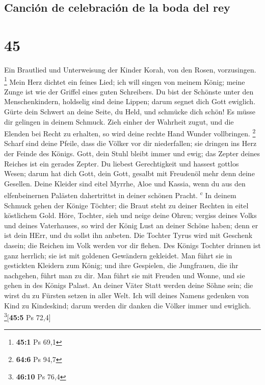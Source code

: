 \hypertarget{canciuxf3n-de-celebraciuxf3n-de-la-boda-del-rey}{%
\subsection{Canción de celebración de la boda del
rey}\label{canciuxf3n-de-celebraciuxf3n-de-la-boda-del-rey}}

\hypertarget{section-44}{%
\section{45}\label{section-44}}

 Ein Brautlied und Unterweisung der Kinder Korah, von den
Rosen, vorzusingen. \footnote{\textbf{45:1} Ps 69,1}  Mein
Herz dichtet ein feines Lied; ich will singen von meinem König; meine
Zunge ist wie der Griffel eines guten Schreibers.  Du bist
der Schönste unter den Menschenkindern, holdselig sind deine Lippen;
darum segnet dich Gott ewiglich.  Gürte dein Schwert an
deine Seite, du Held, und schmücke dich schön!  Es müsse
dir gelingen in deinem Schmuck. Zieh einher der Wahrheit zugut, und die
Elenden bei Recht zu erhalten, so wird deine rechte Hand Wunder
vollbringen. \footnote{\textbf{64:6} Ps 94,7}  Scharf sind
deine Pfeile, dass die Völker vor dir niederfallen; sie dringen ins Herz
der Feinde des Königs.  Gott, dein Stuhl bleibt immer und
ewig; das Zepter deines Reiches ist ein gerades Zepter. 
Du liebest Gerechtigkeit und hassest gottlos Wesen; darum hat dich Gott,
dein Gott, gesalbt mit Freudenöl mehr denn deine Gesellen.
 Deine Kleider sind eitel Myrrhe, Aloe und Kassia, wenn du
aus den elfenbeinernen Palästen dahertrittst in deiner schönen Pracht.
\textsuperscript{c}  In deinem Schmuck gehen der Könige
Töchter; die Braut steht zu deiner Rechten in eitel köstlichem Gold.
 Höre, Tochter, sieh und neige deine Ohren; vergiss
deines Volks und deines Vaterhauses,  so wird der König
Lust an deiner Schöne haben; denn er ist dein HErr, und du sollst ihn
anbeten.  Die Tochter Tyrus wird mit Geschenk dasein; die
Reichen im Volk werden vor dir flehen.  Des Königs
Tochter drinnen ist ganz herrlich; sie ist mit goldenen Gewändern
gekleidet.  Man führt sie in gestickten Kleidern zum
König; und ihre Gespielen, die Jungfrauen, die ihr nachgehen, führt man
zu dir.  Man führt sie mit Freuden und Wonne, und sie
gehen in des Königs Palast.  An deiner Väter Statt werden
deine Söhne sein; die wirst du zu Fürsten setzen in aller Welt.
 Ich will deines Namens gedenken von Kind zu Kindeskind;
darum werden dir danken die Völker immer und ewiglich.
\footnote{\textbf{46:10} Ps 76,4}{[}\textbf{45:5} Ps 72,4{]}

